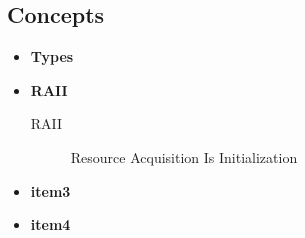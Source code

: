 \documentclass{article}
\begin{document}
    \subsection{Concepts}
      \begin{itemize}
        \item \textbf{Types}
        \item \textbf{RAII}
          \begin{description}
            \item[RAII]
              Resource Acquisition Is Initialization
          \end{description}
        \item \textbf{item3}
        \item \textbf{item4}
      \end{itemize}
\end{document}
